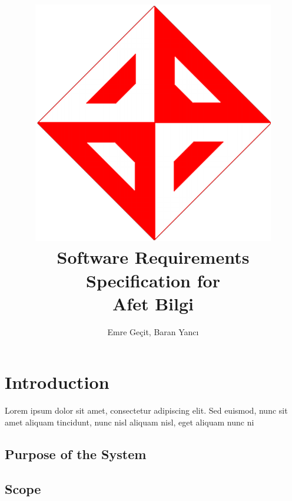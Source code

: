 \documentclass[a4paper]{article}
\author{Emre Geçit, Baran Yancı}
\begin{document}
    \title{\includegraphics[scale=0.2]{ceng_400x400.png}\\ Software Requirements Specification for \\  \textbf{Afet Bilgi}}
    \maketitle

    \newpage
    \makeatletter
	\renewcommand\tableofcontents{%
		\null\hfill\textbf{\Large\contentsname}\hfill\null\par
		\@mkboth{\MakeUppercase\contentsname}{\MakeUppercase\contentsname}%
	}
	\makeatother

    \tableofcontents
    \doublespacing

    \newpage

    \section{Introduction}

        Lorem ipsum dolor sit amet, consectetur adipiscing elit. Sed euismod, nunc sit amet aliquam tincidunt, nunc nisl aliquam nisl, eget aliquam nunc ni

        \subsection{Purpose of the System}

            \subsection{Scope}
\end{document}
